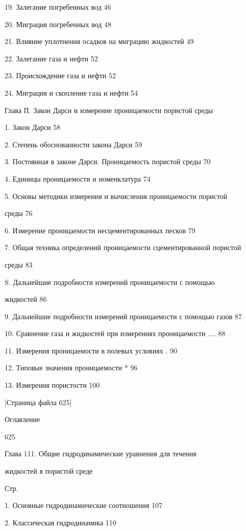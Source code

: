 \documentclass[
  11pt,
]{article}
\begin{document}
19. Залегание погребенных вод 46 \par
20. Миграция погребенных вод 48 \par
21. Влияние уплотнения осадков на миграцию жидкостей 49 \par
22. Залегание газа и нефти 52 \par
23. Происхождение газа и нефти 52 \par
24. Миграция и скопление газа и нефти 54 \par
Глава П. Закон Дарси и измерение проницаемости пористой среды \par
1. Закон Дарси 58 \par
2. Степень обоснованности закона Дарси 59 \par
3. Постоянная в законе Дарси. Проницаемость пористой среды 70 \par
4. Единицы проницаемости и номенклатура 74 \par
5. Основы методики измерения и вычисления проницаемости пористой \par
среды 76 \par
6. Измерение проницаемости несцементированных песков 79 \par
7. Общая техника определений проницаемости сцементированной пористой \par
среды 83 \par
S. Дальнейшие подробности измерений проницаемости с помощью  \par
жидкостей 86 \par
9. Дальнейшие подробности измерений проницаемости с помощью газов 87 \par
10. Сравнение газа и жидкостей при измерениях проницаемости .... 88 \par
11. Измерения проницаемости в полевых условиях . 90 \par
12. Типовые значения проницаемости * 96 \par
13. Измерения пористости 100 \par
\smallskip
\smallskip
\smallskip
{[}Страница файла 625{]}\par
Оглавление \par
625 \par
Глава 111. Общие гидродинамические уравнения для течения \par
жидкостей в пористой среде \par
Стр. \par
1. Основные гидродинамические соотношения 107 \par
2. Классическая гидродинамика 110 \par
\end{document}
